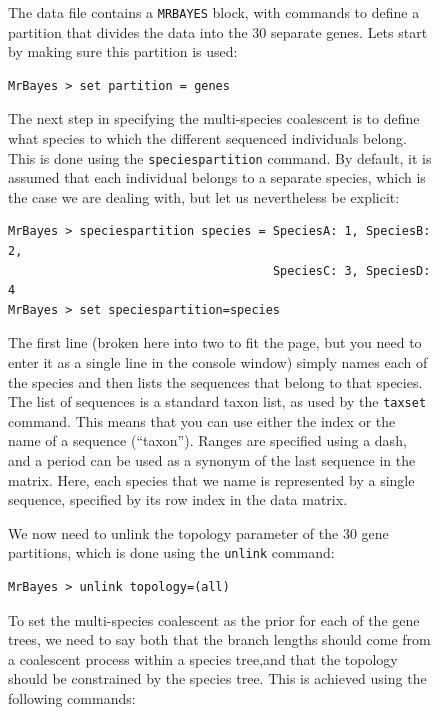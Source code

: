 \documentclass[12pt]{book}
\newcommand{\ttt}[1]{\texttt{#1}}
\begin{document}
\begin{figure}[h]
The data file contains a \ttt{MRBAYES} block, with commands to define a partition that divides the
data into the 30 separate genes. Lets start by making sure this partition is used:

\begin{singlespacing}
\small
\begin{verbatim}
MrBayes > set partition = genes
\end{verbatim}
\end{singlespacing}
\normalsize

The next step in specifying the multi-species coalescent is to define what species to which the
different sequenced individuals belong. This is done using the \ttt{speciespartition} command. By
default, it is assumed that each individual belongs to a separate species, which is the case we are
dealing with, but let us nevertheless be explicit:

\begin{singlespacing}
\small
\begin{verbatim}
MrBayes > speciespartition species = SpeciesA: 1, SpeciesB: 2,
                                     SpeciesC: 3, SpeciesD: 4
MrBayes > set speciespartition=species
\end{verbatim}
\end{singlespacing}
\normalsize

The first line (broken here into two to fit the page, but you need to enter it as a single line in
the console window) simply names each of the species and then lists the sequences that belong to
that species. The list of sequences is a standard taxon list, as used by the \ttt{taxset} command.
This means that you can use either the index or the name of a sequence (``taxon''). Ranges are
specified using a dash, and a period can be used as a synonym of the last sequence in the matrix.
Here, each species that we name is represented by a single sequence, specified by its row index in
the data matrix.

We now need to unlink the topology parameter of the 30 gene partitions, which is done using the
\ttt{unlink} command:

\begin{singlespacing}
\small
\begin{verbatim}
MrBayes > unlink topology=(all)
\end{verbatim}
\end{singlespacing}
\normalsize

To set the multi-species coalescent as the prior for each of the gene trees, we need to say both
that the branch lengths should come from a coalescent process within a species tree,and that the
topology should be constrained by the species tree. This is achieved using the following commands:


\end{figure}
\end{document}
